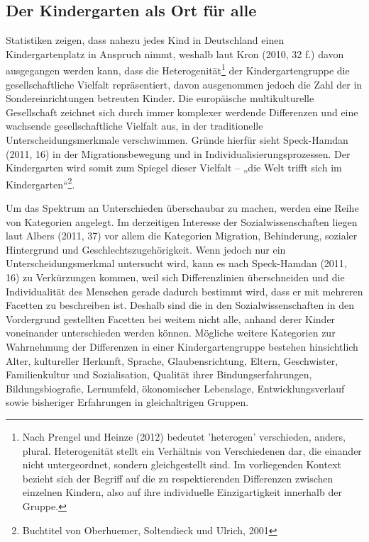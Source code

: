 \subsection{Der Kindergarten als Ort für alle}\label{OrtFuerAlle}
Statistiken zeigen, dass nahezu jedes Kind in Deutschland einen Kindergartenplatz in Anspruch nimmt, weshalb laut Kron (2010, 32 f.) davon ausgegangen werden kann, dass die Heterogenität\footnote{Nach Prengel und Heinze (2012) bedeutet 'heterogen' verschieden, anders, plural. Heterogenität stellt ein Verhältnis von Verschiedenen dar, die einander nicht untergeordnet, sondern gleichgestellt sind. Im vorliegenden Kontext bezieht sich der Begriff auf die zu respektierenden Differenzen zwischen einzelnen Kindern, also auf ihre individuelle Einzigartigkeit innerhalb der Gruppe.}
der Kindergartengruppe die gesellschaftliche Vielfalt repräsentiert, davon ausgenommen jedoch die Zahl der in Sondereinrichtungen betreuten Kinder. Die europäische multikulturelle Gesellschaft zeichnet sich durch immer komplexer werdende Differenzen und eine wachsende gesellschaftliche Vielfalt aus, in der traditionelle Unterscheidungsmerkmale verschwimmen. Gründe hierfür sieht Speck-Hamdan (2011, 16) in der Migrationsbewegung und in Individualisierungsprozessen. Der Kindergarten wird somit zum Spiegel dieser Vielfalt – „die Welt trifft sich im Kindergarten“\footnote{Buchtitel von Oberhuemer, Soltendieck und Ulrich, 2001}.
 
Um das Spektrum an Unterschieden überschaubar zu machen, werden eine Reihe von Kategorien angelegt. Im derzeitigen Interesse der Sozialwissenschaften liegen laut Albers (2011, 37) vor allem die Kategorien Migration, Behinderung, sozialer Hintergrund und Geschlechtszugehörigkeit.
Wenn jedoch nur ein Unterscheidungsmerkmal untersucht wird, kann es nach Speck-Hamdan (2011, 16) zu Verkürzungen kommen, weil sich Differenzlinien überschneiden und die Individualität des Menschen gerade dadurch bestimmt wird, dass er mit mehreren Facetten zu beschreiben ist. Deshalb sind die in den Sozialwissenschaften in den Vordergrund gestellten Facetten bei weitem nicht alle, anhand derer Kinder voneinander unterschieden werden können. Mögliche weitere Kategorien zur Wahrnehmung der Differenzen in einer Kindergartengruppe bestehen hinsichtlich Alter, kultureller Herkunft, Sprache, Glaubensrichtung, Eltern, Geschwister, Familienkultur und Sozialisation, Qualität ihrer Bindungserfahrungen, Bildungsbiografie, Lernumfeld, ökonomischer Lebenslage, Entwicklungsverlauf sowie bisheriger Erfahrungen in gleichaltrigen Gruppen. 

